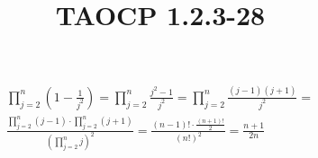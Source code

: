 \documentclass{article}
\title{TAOCP 1.2.3\mbox{-}28}
\begin{document}
\maketitle

\begin{multline*}
\prod_{j=2}^{n}(1-\frac{1}{j^{2}}) = \prod_{j=2}^{n}\frac{j^{2}-1}{j^{2}} = \prod_{j=2}^{n}\frac{(j-1)(j+1)}{j^{2}} = \\
\frac{\prod_{j=2}^{n}(j-1) \cdot \prod_{j=2}^{n}(j+1)}{{(\prod_{j=2}^{n} j)}^{2}} = \frac{(n-1)!\cdot \frac{(n+1)!}{2}}{{(n!)}^{2}} = \frac{n+1}{2n}
\end{multline*}
\end{document}
